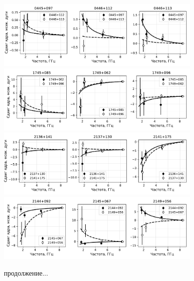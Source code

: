 \addtocounter{figure}{-1}
\begin{figure}
 \centering
 \includegraphics[width=0.9\textwidth]{cs_vs_freq_using_jet_pa/cs_4}
 \includegraphics[width=0.9\textwidth]{cs_vs_freq_using_jet_pa/cs_5}
 \includegraphics[width=0.9\textwidth]{cs_vs_freq_using_jet_pa/cs_6}
 \includegraphics[width=0.9\textwidth]{cs_vs_freq_using_jet_pa/cs_7}
 \caption{продолжение...}
\end{figure}


